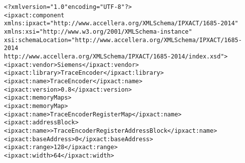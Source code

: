 \begin{alltt}
<?xml version="1.0" encoding="UTF-8"?>
<ipxact:component 
   xmlns:ipxact="http://www.accellera.org/XMLSchema/IPXACT/1685-2014"
   xmlns:xsi="http://www.w3.org/2001/XMLSchema-instance" 
   xsi:schemaLocation="http://www.accellera.org/XMLSchema/IPXACT/1685-2014 
                       http://www.accellera.org/XMLSchema/IPXACT/1685-2014/index.xsd">
   <ipxact:vendor>Siemens</ipxact:vendor>
   <ipxact:library>TraceEncoder</ipxact:library>
   <ipxact:name>TraceEncoder</ipxact:name>
   <ipxact:version>0.8</ipxact:version>
   <ipxact:memoryMaps>
      <ipxact:memoryMap>
         <ipxact:name>Trace Encoder Register Map</ipxact:name>
         <ipxact:addressBlock>
            <ipxact:name>>Trace Encoder Register Address Block</ipxact:name>
            <ipxact:baseAddress>0</ipxact:baseAddress>
            <ipxact:range>128</ipxact:range>
            <ipxact:width>64</ipxact:width>


\end{alltt}

